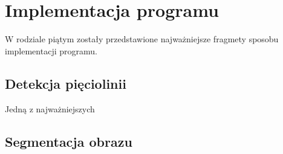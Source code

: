 \chapter{Implementacja programu}
W rodziale piątym zostały przedstawione najważniejsze fragmety sposobu implementacji programu. 

\section{Detekcja pięciolinii}
Jedną z najważniejszych 


\section{Segmentacja obrazu}